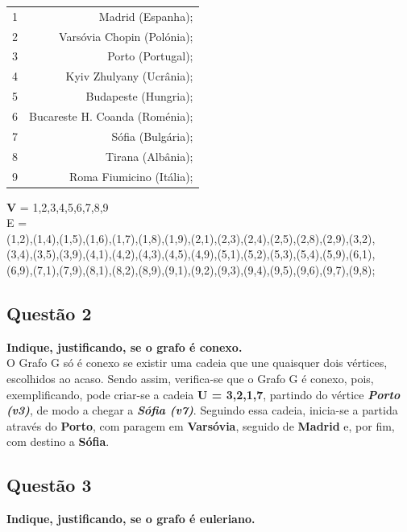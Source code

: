 \documentclass{report}
\begin{document}
\begin{center}
\begin{table}[h]
\centering
\begin{tabular}{r|r}
 1 & Madrid (Espanha); \\
 2 & Varsóvia Chopin (Polónia); \\ 
 3 & Porto (Portugal); \\
 4 & Kyiv Zhulyany (Ucrânia); \\
 5 & Budapeste (Hungria); \\
 6 & Bucareste H. Coanda (Roménia); \\
 7 & Sófia (Bulgária); \\
 8 & Tirana (Albânia); \\
 9 & Roma Fiumicino (Itália); 
 \end{tabular}
 \end{table}
 \end{center}
\textbf{V} = {1,2,3,4,5,6,7,8,9} \\
E = \\ (1,2),(1,4),(1,5),(1,6),(1,7),(1,8),(1,9),(2,1),(2,3),(2,4),(2,5),(2,8),(2,9),(3,2),\\(3,4),(3,5),(3,9),(4,1),(4,2),(4,3),(4,5),(4,9),(5,1),(5,2),(5,3),(5,4),(5,9),(6,1),\\(6,9),(7,1),(7,9),(8,1),(8,2),(8,9),(9,1),(9,2),(9,3),(9,4),(9,5),(9,6),(9,7),(9,8); 

\subsection{Questão 2} 
\textbf{Indique, justificando, se o grafo é conexo.} \cite{antero_2007}\\ 

O Grafo G só é conexo se existir uma cadeia que une quaisquer dois vértices, escolhidos ao acaso. Sendo assim, verifica-se que o Grafo G é conexo, pois, exemplificando, pode criar-se a cadeia \textbf{U = {3,2,1,7}}, partindo do vértice \textit{\textbf{Porto (v3)}}, de modo a chegar a \textit{\textbf{Sófia (v7)}}. Seguindo essa cadeia, inicia-se a partida através do \textbf{Porto}, com paragem em \textbf{Varsóvia}, seguido de \textbf{Madrid} e, por fim, com destino a \textbf{Sófia}.


\subsection{Questão 3}
\textbf{Indique, justificando, se o grafo é euleriano.} \\
\end{document}
